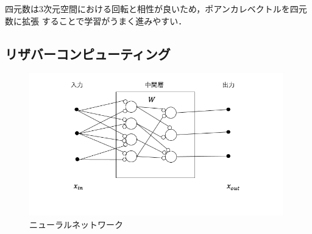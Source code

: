 \documentclass[uplatex,a4paper,10pt]{jsarticle}
\begin{document}
四元数は3次元空間における回転と相性が良いため，ポアンカレベクトルを四元数に拡張
することで学習がうまく進みやすい．


\subsection{リザバーコンピューティング}


\begin{figure}[hbtp]
	\centering
	\includegraphics[width=110mm]{../img/neural.png}
    \caption{ニューラルネットワーク}
	\label{fig:neural}
\end{figure}
\end{document}
